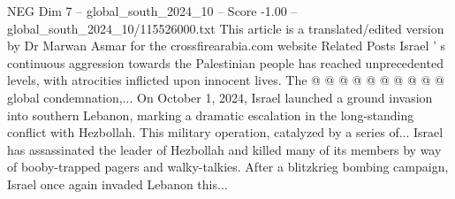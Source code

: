 \begin{textsample}{NEG Dim 7 – global\_south\_2024\_10 – Score -1.00 – global\_south\_2024\_10/115526000.txt}
This article is a translated/edited version by Dr Marwan Asmar for the crossfirearabia.com website Related Posts Israel ' s continuous aggression towards the Palestinian people has reached unprecedented levels, with atrocities inflicted upon innocent lives.
The @ @ @ @ @ @ @ @ @ @ global condemnation,...
On October 1, 2024, Israel launched a ground invasion into southern Lebanon, marking a dramatic escalation in the long-standing conflict with Hezbollah.
This military operation, catalyzed by a series of...
Israel has assassinated the leader of Hezbollah and killed many of its members by way of booby-trapped pagers and walky-talkies.
After a blitzkrieg bombing campaign, Israel once again invaded Lebanon this...

\end{textsample}
